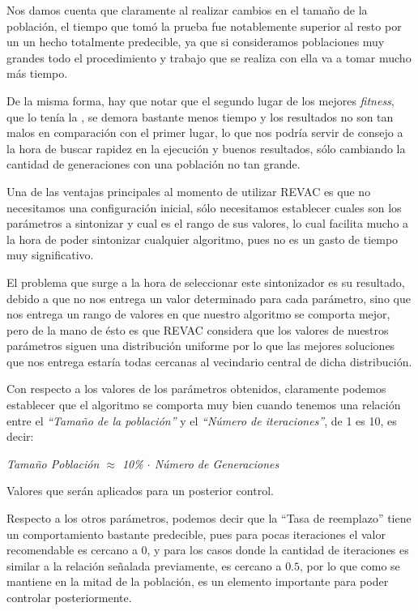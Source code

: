 Nos damos cuenta que claramente al realizar cambios en el tamaño de la población, el tiempo que tomó la prueba fue
notablemente superior al resto por un un hecho totalmente predecible, ya que si consideramos poblaciones muy grandes
todo el procedimiento y trabajo que se realiza con ella va a tomar mucho más tiempo.

De la misma forma, hay que notar que el segundo lugar de los mejores \emph{fitness}, que lo tenía la ,
se demora bastante menos tiempo y los resultados no son tan malos en comparación con el primer lugar, lo que nos podría
servir de consejo a la hora de buscar rapidez en la ejecución y buenos resultados, sólo cambiando la cantidad de generaciones
con una población no tan grande.


Una de las ventajas principales al momento de utilizar REVAC es que no necesitamos una configuración inicial,
sólo necesitamos establecer cuales son los parámetros a sintonizar y cual es el rango de sus valores, lo cual
facilita mucho a la hora de poder sintonizar cualquier algoritmo, pues no es un gasto de tiempo muy significativo.

El problema que surge a la hora de seleccionar este sintonizador es su resultado, debido a que no nos entrega
un valor determinado para cada parámetro, sino que nos entrega un rango de valores en que nuestro algoritmo se comporta mejor,
pero de la mano de ésto es que REVAC considera que los valores de nuestros parámetros siguen una distribución uniforme
por lo que las mejores soluciones que nos entrega estaría todas cercanas al vecindario central de dicha distribución.

Con respecto a los valores de los parámetros obtenidos, claramente podemos establecer que el algoritmo
se comporta muy bien cuando tenemos una relación entre el \emph{``Tamaño de la población''} y el \emph{``Número de iteraciones''},
de 1 es 10, es decir:

\begin{center}
\emph{Tamaño Población  $\approx$  10\% $\cdot$ Número de Generaciones}
\end{center}

Valores que serán aplicados para un posterior control.

Respecto a los otros parámetros, podemos decir que la ``Tasa de reemplazo'' tiene un comportamiento
bastante predecible, pues para pocas iteraciones el valor recomendable es cercano a 0,
y para los casos donde la cantidad de iteraciones es similar a la relación señalada previamente,
es cercano a $0.5$, por lo que como se mantiene en la mitad de la población, es un elemento importante
para poder controlar posteriormente.

